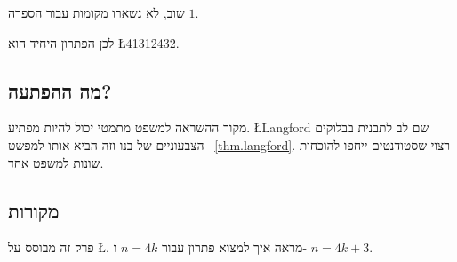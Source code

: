 \noindent
שוב, לא נשארו מקומות עבור הספרה $1$.

\medskip

\noindent 
לכן הפתרון היחיד הוא
\L{41312432}.

\subsection*{מה ההפתעה?}

מקור ההשראה למשפט מתמטי יכול להיות מפתיע.
\L{Langford}
שם לב לתבנית בבלוקים הצבעוניים של בנו וזה הביא אותו למפשט%
~\ref{thm.langford}.
רצוי שסטודנטים ייחפו להוכחות שונות למשפט אחד.

\subsection*{מקורות}
פרק זה מבוסס על
\L{\cite{miller}}.
\cite{davies}
מראה איך למצוא פתרון עבור
$n=4k$
ו-%
$n=4k+3$.
